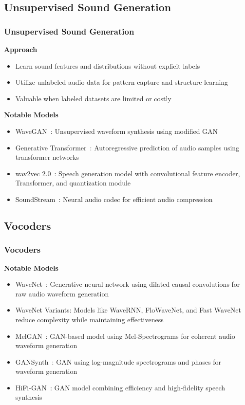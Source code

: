 \subsection{Unsupervised Sound Generation}

\begin{frame}
    \frametitle{Unsupervised Sound Generation}

    \textbf{Approach}
    \begin{itemize}
        \item Learn sound features and distributions without explicit labels
        \item Utilize unlabeled audio data for pattern capture and structure learning
        \item Valuable when labeled datasets are limited or costly
    \end{itemize}

    \textbf{Notable Models}
    \begin{itemize}
        \item WaveGAN~\cite{donahue_adversarial_2019}: Unsupervised waveform synthesis using modified GAN
        \item Generative Transformer~\cite{verma_generative_2021}: Autoregressive prediction of audio samples using transformer networks
        \item wav2vec 2.0~\cite{baevski_wav2vec_2020}: Speech generation model with convolutional feature encoder, Transformer, and quantization module
        \item SoundStream~\cite{zeghidour_soundstream_2021}: Neural audio codec for efficient audio compression
    \end{itemize}
\end{frame}


\subsection{Vocoders}

\begin{frame}
    \frametitle{Vocoders}

    \textbf{Notable Models}
    \begin{itemize}
        \item WaveNet~\cite{oord_wavenet_2016}: Generative neural network using dilated causal convolutions for raw audio waveform generation
        \item WaveNet Variants: Models like WaveRNN, FloWaveNet, and Fast WaveNet reduce complexity while maintaining effectiveness
        \item MelGAN~\cite{kumar_melgan_2019}: GAN-based model using Mel-Spectrograms for coherent audio waveform generation
        \item GANSynth~\cite{engel_gansynth_2019}: GAN using log-magnitude spectrograms and phases for waveform generation
        \item HiFi-GAN~\cite{kong_hifi-gan_2020}: GAN model combining efficiency and high-fidelity speech synthesis
    \end{itemize}
\end{frame}


